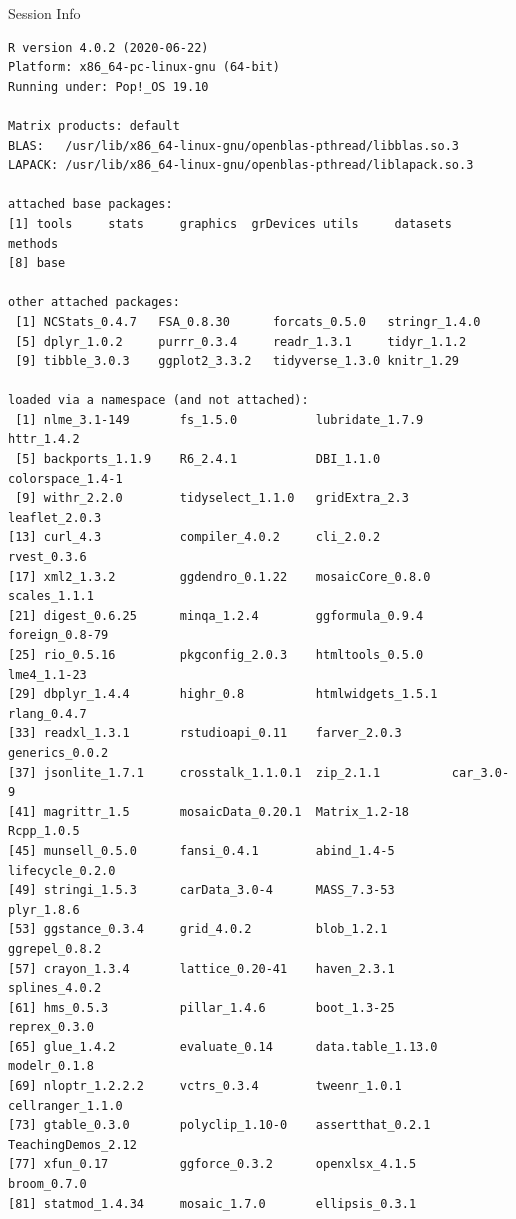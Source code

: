 \documentclass[10pt,handout]{beamer}\usepackage[]{graphicx}\usepackage[]{color}
\makeatletter
\newenvironment{kframe}{%
 \def\at@end@of@kframe{}%
 \ifinner\ifhmode%
  \def\at@end@of@kframe{\end{minipage}}%
  \begin{minipage}{\columnwidth}%
 \fi\fi%
 \def\FrameCommand##1{\hskip\@totalleftmargin \hskip-\fboxsep
 \colorbox{shadecolor}{##1}\hskip-\fboxsep
     \hskip-\linewidth \hskip-\@totalleftmargin \hskip\columnwidth}%
 \MakeFramed {\advance\hsize-\width
   \@totalleftmargin\z@ \linewidth\hsize
   \@setminipage}}%
 {\par\unskip\endMakeFramed%
 \at@end@of@kframe}
\newenvironment{knitrout}{}{} %
\makeatother
\begin{document}
\begin{frame}[fragile]{Session Info}
	\tiny
	
\begin{knitrout}\tiny
{}\color{fgcolor}\begin{kframe}
\begin{verbatim}
R version 4.0.2 (2020-06-22)
Platform: x86_64-pc-linux-gnu (64-bit)
Running under: Pop!_OS 19.10

Matrix products: default
BLAS:   /usr/lib/x86_64-linux-gnu/openblas-pthread/libblas.so.3
LAPACK: /usr/lib/x86_64-linux-gnu/openblas-pthread/liblapack.so.3

attached base packages:
[1] tools     stats     graphics  grDevices utils     datasets  methods  
[8] base     

other attached packages:
 [1] NCStats_0.4.7   FSA_0.8.30      forcats_0.5.0   stringr_1.4.0  
 [5] dplyr_1.0.2     purrr_0.3.4     readr_1.3.1     tidyr_1.1.2    
 [9] tibble_3.0.3    ggplot2_3.3.2   tidyverse_1.3.0 knitr_1.29     

loaded via a namespace (and not attached):
 [1] nlme_3.1-149       fs_1.5.0           lubridate_1.7.9    httr_1.4.2        
 [5] backports_1.1.9    R6_2.4.1           DBI_1.1.0          colorspace_1.4-1  
 [9] withr_2.2.0        tidyselect_1.1.0   gridExtra_2.3      leaflet_2.0.3     
[13] curl_4.3           compiler_4.0.2     cli_2.0.2          rvest_0.3.6       
[17] xml2_1.3.2         ggdendro_0.1.22    mosaicCore_0.8.0   scales_1.1.1      
[21] digest_0.6.25      minqa_1.2.4        ggformula_0.9.4    foreign_0.8-79    
[25] rio_0.5.16         pkgconfig_2.0.3    htmltools_0.5.0    lme4_1.1-23       
[29] dbplyr_1.4.4       highr_0.8          htmlwidgets_1.5.1  rlang_0.4.7       
[33] readxl_1.3.1       rstudioapi_0.11    farver_2.0.3       generics_0.0.2    
[37] jsonlite_1.7.1     crosstalk_1.1.0.1  zip_2.1.1          car_3.0-9         
[41] magrittr_1.5       mosaicData_0.20.1  Matrix_1.2-18      Rcpp_1.0.5        
[45] munsell_0.5.0      fansi_0.4.1        abind_1.4-5        lifecycle_0.2.0   
[49] stringi_1.5.3      carData_3.0-4      MASS_7.3-53        plyr_1.8.6        
[53] ggstance_0.3.4     grid_4.0.2         blob_1.2.1         ggrepel_0.8.2     
[57] crayon_1.3.4       lattice_0.20-41    haven_2.3.1        splines_4.0.2     
[61] hms_0.5.3          pillar_1.4.6       boot_1.3-25        reprex_0.3.0      
[65] glue_1.4.2         evaluate_0.14      data.table_1.13.0  modelr_0.1.8      
[69] nloptr_1.2.2.2     vctrs_0.3.4        tweenr_1.0.1       cellranger_1.1.0  
[73] gtable_0.3.0       polyclip_1.10-0    assertthat_0.2.1   TeachingDemos_2.12
[77] xfun_0.17          ggforce_0.3.2      openxlsx_4.1.5     broom_0.7.0       
[81] statmod_1.4.34     mosaic_1.7.0       ellipsis_0.3.1    
\end{verbatim}
\end{kframe}
\end{knitrout}

\end{frame}
\end{document}
